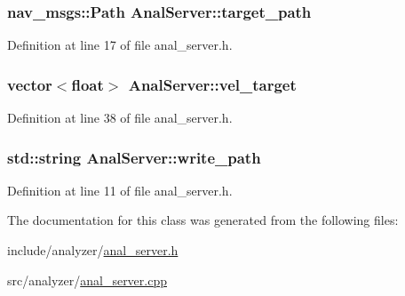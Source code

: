 \subsubsection[{\texorpdfstring{target\+\_\+path}{target_path}}]{\setlength{\rightskip}{0pt plus 5cm}nav\+\_\+msgs\+::\+Path Anal\+Server\+::target\+\_\+path}\hypertarget{class_anal_server_a1d535244ef666b575e1d82fd70c20e03}{}\label{class_anal_server_a1d535244ef666b575e1d82fd70c20e03}


Definition at line 17 of file anal\+\_\+server.\+h.

\subsubsection[{\texorpdfstring{vel\+\_\+target}{vel_target}}]{\setlength{\rightskip}{0pt plus 5cm}vector$<$float$>$ Anal\+Server\+::vel\+\_\+target}\hypertarget{class_anal_server_a346b99fa407494faafc2d0d52e946e51}{}\label{class_anal_server_a346b99fa407494faafc2d0d52e946e51}


Definition at line 38 of file anal\+\_\+server.\+h.

\subsubsection[{\texorpdfstring{write\+\_\+path}{write_path}}]{\setlength{\rightskip}{0pt plus 5cm}std\+::string Anal\+Server\+::write\+\_\+path}\hypertarget{class_anal_server_ad16405e56690aba4b2ff012c7219f146}{}\label{class_anal_server_ad16405e56690aba4b2ff012c7219f146}


Definition at line 11 of file anal\+\_\+server.\+h.



The documentation for this class was generated from the following files\+:\begin{DoxyCompactItemize}
\item 
include/analyzer/\hyperlink{anal__server_8h}{anal\+\_\+server.\+h}\item 
src/analyzer/\hyperlink{anal__server_8cpp}{anal\+\_\+server.\+cpp}\end{DoxyCompactItemize}
